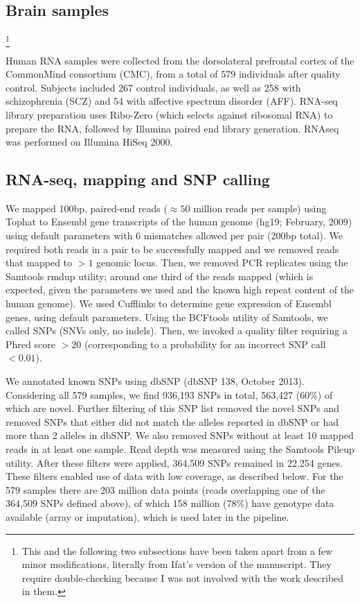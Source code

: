 \documentclass[letterpaper]{article}
\begin{document}
\subsection{Brain samples}

\footnote{This and the following two subsections
have been taken apart from a few minor modifications, literally from Ifat's
version of the manuscript.  They require double-checking because I was not
involved with the work described in them.}

Human RNA samples were collected from the dorsolateral prefrontal cortex of
the CommonMind consortium (CMC), from a total of \(579\) individuals after
quality control. Subjects included 267 control individuals, as well as 258
with schizophrenia (SCZ) and 54 with affective spectrum disorder (AFF).
RNA-seq library preparation uses Ribo-Zero (which selects against ribosomal
RNA) to prepare the RNA, followed by Illumina paired end library generation.
RNAseq was performed on Illumina HiSeq 2000.

\subsection{RNA-seq, mapping and SNP calling}

We mapped 100bp, paired-end reads (\(\approx50\) million reads per sample) using Tophat
to Ensembl gene transcripts of the human genome (hg19; February, 2009) using
default parameters with 6 mismatches allowed per pair (200bp total). We
required both reads in a pair to be successfully mapped and we removed reads
that mapped to \(>1\) genomic locus. Then, we removed PCR replicates using the
Samtools rmdup utility; around one third of the reads mapped (which is
expected, given the parameters we used and the known high repeat content of
the human genome). We used Cufflinks to determine gene expression of Ensembl
genes, using default parameters. Using the BCFtools utility of Samtools, we
called SNPs (SNVs only, no indels). Then, we invoked a quality filter
requiring a Phred score \(>20\) (corresponding to a probability for an
incorrect SNP call \(<0.01\)).

We annotated known SNPs using dbSNP (dbSNP 138, October 2013). Considering all
579 samples, we find 936,193 SNPs in total, 563,427 (60\%) of which are novel.
Further filtering of this SNP list removed the novel SNPs and removed SNPs
that either did not match the alleles reported in dbSNP or had more than 2
alleles in dbSNP. We also removed SNPs without at least 10 mapped reads in at
least one sample. Read depth was measured using the Samtools Pileup utility.
After these filters were applied, 364,509 SNPs remained in 22,254 genes. These
filters enabled use of data with low coverage, as described below. For the 579
samples there are 203 million data points (reads overlapping one of the
364,509 SNPs defined above), of which 158 million (78\%) have genotype data
available (array or imputation), which is used later in the pipeline.
\end{document}
